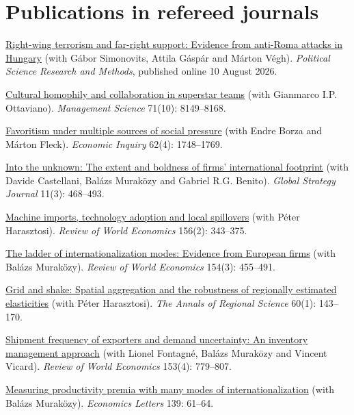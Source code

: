 \documentclass[10pt,a4paper]{article}
\newcommand{\jn}[1]{\textit{#1}}
\begin{document}
\section{Publications in refereed journals}
\begin{cvlist}
  \item[2026] \href{https://doi.org/10.1017/psrm.2026.10111}{Right-wing terrorism and far-right support: Evidence from anti-Roma attacks in Hungary} (with Gábor Simonovits, Attila Gáspár and Márton Végh). \jn{Political Science Research and Methods}, published online 10 August 2026.
  \item[2025] \href{https://doi.org/10.1287/mnsc.2022.01799}{Cultural homophily and collaboration in superstar teams} (with Gianmarco I.P. Ottaviano). \jn{Management Science} 71(10): 8149--8168.
  \item[2024] \href{https://doi.org/10.1111/ecin.13245}{Favoritism under multiple sources of social pressure} (with Endre Borza and Márton Fleck). \jn{Economic Inquiry} 62(4): 1748--1769.
  \item[2021] \href{https://doi.org/10.1002/gsj.1397}{Into the unknown: The extent and boldness of firms' international footprint} (with Davide Castellani, Balázs Muraközy and Gabriel R.G. Benito). \jn{Global Strategy Journal} 11(3): 468--493.
  \item[2020] \href{https://doi.org/10.1007/s10290-019-00365-y}{Machine imports, technology adoption and local spillovers} (with Péter Harasztosi). \jn{Review of World Economics} 156(2): 343--375.
  \item[2018] \href{https://doi.org/10.1007/s10290-018-0305-9}{The ladder of internationalization modes: Evidence from European firms} (with Balázs Muraközy). \jn{Review of World Economics} 154(3): 455--491.
  \item[2018] \href{https://doi.org/10.1007/s00168-017-0849-y}{Grid and shake: Spatial aggregation and the robustness of regionally estimated elasticities} (with Péter Harasztosi). \jn{The Annals of Regional Science} 60(1): 143--170.
  \item[2017] \href{https://doi.org/10.1007/s10290-017-0286-0}{Shipment frequency of exporters and demand uncertainty: An inventory management approach} (with Lionel Fontagné, Balázs Muraközy and Vincent Vicard). \jn{Review of World Economics} 153(4): 779--807.
  \item[2016] \href{https://doi.org/10.1016/j.econlet.2015.12.016}{Measuring productivity premia with many modes of internationalization} (with Balázs Muraközy). \jn{Economics Letters} 139: 61--64.

\end{cvlist}
\end{document}
